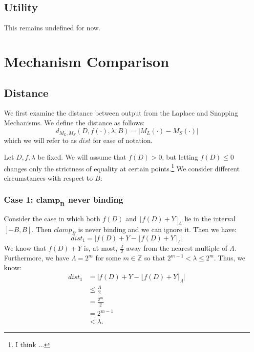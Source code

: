 \documentclass[11pt]{scrartcl} %
\begin{document}
\subsection{Utility}
This remains undefined for now.

\section{Mechanism Comparison}
\subsection{Distance}
We first examine the distance between output from the Laplace and Snapping Mechanisms. We define the distance as follows:
\[ d_{M_L, M_S}(D, f(\cdot), \lambda, B) = \big\vert M_L(\cdot) - M_S(\cdot) \big\vert \]
which we will refer to as $dist$ for ease of notation. \newline

Let $D, f, \lambda$ be fixed. We will assume that $f(D) > 0$,
but letting $f(D) \leq 0$ changes only the strictness of equality at certain points.\footnote{I think $\hdots$} We consider different circumstances with respect to $B$:

\subsubsection{Case 1: $\boldsymbol{clamp_B}$ never binding}
Consider the case in which both $f(D)$ and $\lfloor f(D) + Y \rceil_{\Lambda}$ lie in the interval $[-B, B]$.
Then $clamp_B$ is never binding and we can ignore it. Then we have:
\[ dist_1 = \big\vert f(D) + Y - \lfloor f(D) + Y \rceil_{\Lambda} \big\vert \]
We know that $f(D) + Y$ is, at most, $\frac{\Lambda}{2}$ away from the nearest multiple of $\Lambda$. Furthermore, we have $\Lambda = 2^m$ for some $m \in \mathbb{Z}$ so that $2^{m-1} < \lambda \leq 2^{m}$. Thus, we know:
\begin{align}
	dist_1 &= \big\vert f(D) + Y - \lfloor f(D) + Y \rceil_{\Lambda} \big\vert \nonumber \\
		 &\leq \frac{\Lambda}{2} \nonumber \\
		 &= \frac{2^m}{2} \nonumber \\
		 &= 2^{m-1} \nonumber \\
		 &< \lambda. \nonumber
\end{align}
\end{document}

